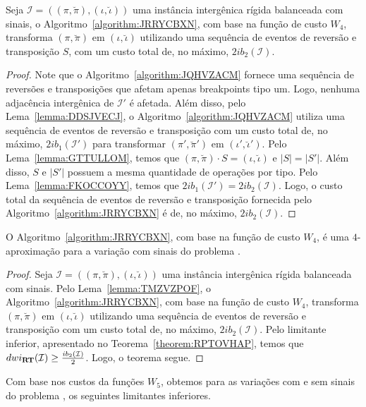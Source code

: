 \begin{lemma}\label{lemma:TMZVZPOF}
Seja $\mathcal{I} = ((\pi,\breve\pi),(\iota,\breve\iota))$ uma instância intergênica rígida balanceada com sinais, o Algoritmo~\ref{algorithm:JRRYCBXN}, com base na função de custo $W_4$, transforma $(\pi,\breve\pi)$ em $(\iota,\breve\iota)$ utilizando uma sequência de eventos de reversão e transposição $S$, com um custo total de, no máximo, $2ib_2(\mathcal{I})$.
\end{lemma}
\begin{proof}
Note que o Algoritmo~\ref{algorithm:JQHVZACM} fornece uma sequência de reversões e transposições que afetam apenas breakpoints tipo um. Logo, nenhuma adjacência intergênica de $\mathcal{I'}$ é afetada. Além disso, pelo Lema~\ref{lemma:DDSJVECJ}, o Algoritmo~\ref{algorithm:JQHVZACM} utiliza uma sequência de eventos de reversão e transposição com um custo total de, no máximo, $2ib_1(\mathcal{I'})$ para transformar $(\pi',\breve\pi')$ em $(\iota',\breve\iota')$. Pelo Lema~\ref{lemma:GTTULLOM}, temos que $(\pi,\breve\pi) \cdot S = (\iota,\breve\iota)$ e $|S| = |S'|$. Além disso, $S$ e $|S'|$ possuem a mesma quantidade de operações por tipo. Pelo Lema~\ref{lemma:FKOCCOYY}, temos que $2ib_1(\mathcal{I'}) = 2ib_2(\mathcal{I})$. Logo, o custo total da sequência de eventos de reversão e transposição fornecida pelo Algoritmo~\ref{algorithm:JRRYCBXN} é de, no máximo, $2ib_2(\mathcal{I})$.
\end{proof}

\begin{theorem}\label{theorem:IUDGQWGI}
O Algoritmo~\ref{algorithm:JRRYCBXN}, com base na função de custo $W_4$, é uma $4$-aproximação para a variação com sinais do problema \SbWIRT{}.
\end{theorem}
\begin{proof}
Seja $\mathcal{I} = ((\pi,\breve\pi),(\iota,\breve\iota))$ uma instância intergênica rígida balanceada com sinais. Pelo Lema~\ref{lemma:TMZVZPOF}, o Algoritmo~\ref{algorithm:JRRYCBXN}, com base na função de custo $W_4$, transforma $(\pi,\breve\pi)$ em $(\iota,\breve\iota)$ utilizando uma sequência de eventos de reversão e transposição com um custo total de, no máximo, $2ib_2(\mathcal{I})$. Pelo limitante inferior, apresentado no Teorema~\ref{theorem:RPTOVHAP}, temos que $dwi_{\textbf{RT}}(\mathcal{I}) \ge \frac{ib_2(\mathcal{I})}{2}$. Logo, o teorema segue.
\end{proof}

Com base nos custos da funções $W_5$, obtemos para as variações com e sem sinais do problema \SbWIRT{}, os seguintes limitantes inferiores.

